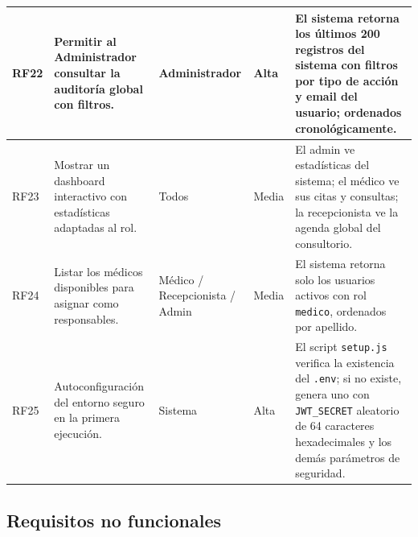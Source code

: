 \documentclass[11pt,a4paper]{article}
\begin{document}
\begin{longtable}{|C{1cm}|L{5cm}|L{2.5cm}|C{1cm}|L{4cm}|}
    RF22        & Permitir al Administrador consultar la auditoría global con filtros.                                                   & Administrador                  & Alta            & El sistema retorna los últimos 200 registros del sistema con filtros por tipo de acción y email del usuario; ordenados cronológicamente.                                                                                   \\
    \hline

    RF23        & Mostrar un dashboard interactivo con estadísticas adaptadas al rol.                                                    & Todos                          & Media           & El admin ve estadísticas del sistema; el médico ve sus citas y consultas; la recepcionista ve la agenda global del consultorio.                                                                                            \\
    \hline

    RF24        & Listar los médicos disponibles para asignar como responsables.                                                         & Médico / Recepcionista / Admin & Media           & El sistema retorna solo los usuarios activos con rol \texttt{medico}, ordenados por apellido.                                                                                                                              \\
    \hline

    RF25        & Autoconfiguración del entorno seguro en la primera ejecución.                                                          & Sistema                        & Alta            & El script \texttt{setup.js} verifica la existencia del \texttt{.env}; si no existe, genera uno con \texttt{JWT\_SECRET} aleatorio de 64 caracteres hexadecimales y los demás parámetros de seguridad.                      \\
    \hline
\end{longtable}

\subsection{Requisitos no funcionales}
\end{document}
